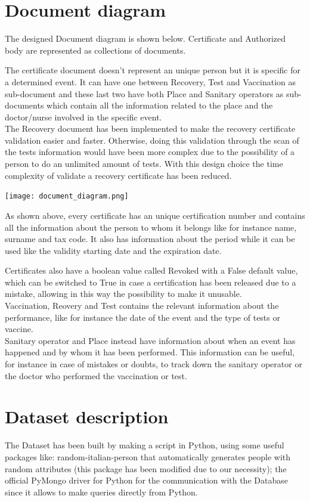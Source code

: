 \documentclass{article}
\begin{document}
\section{Document diagram}
The designed Document diagram is shown below. Certificate and Authorized body are represented as collections of documents.

The certificate document doesn't represent an unique person but it is specific for a determined event. It can have one between Recovery, Test and Vaccination as sub-document and these last two have both Place and Sanitary operators as sub-documents which contain all the information related to the place and the doctor/nurse involved in the specific event.
\hfill\break
\\
The Recovery document has been implemented to make the recovery certificate validation easier and faster. Otherwise, doing this validation through the scan of the tests information would have been more complex due to the possibility of a person to do an unlimited amount of tests.
With this design choice the time complexity of validate a recovery certificate has been reduced.
\hfill\break
\hfill\break


\begin{center}
\texttt{[image: document\_diagram.png]}
\end{center}
As shown above, every certificate has an unique certification number and contains all the information about the person to whom it belongs like for instance name, surname and tax code. It also has information about the period while it can be used like the validity starting date and the expiration date. 

Certificates also have a boolean value called Revoked with a False default value, which can be switched to True in case a certification has been released due to a mistake, allowing in this way the possibility to make it unusable.
\\

Vaccination, Reovery and Test contains the relevant information about the performance, like for instance the date of the event and the type of tests or vaccine.
\\

Sanitary operator and Place instead have information about when an event has happened and by whom it has been performed. This information can be useful, for instance in case of mistakes or doubts, to track down the sanitary operator or the doctor who performed the vaccination or test.

\section{Dataset description}
The Dataset has been built by making a script in Python, using some useful packages like: {\selectfont random-italian-person} that automatically generates people with random attributes (this package has been modified due to our necessity); the official {\selectfont PyMongo} driver for Python for the communication with the Database since it allows to make queries directly from Python.
\end{document}
